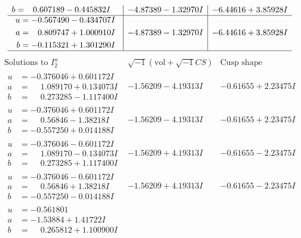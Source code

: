 \documentclass[1p]{elsarticle_modified}
\theoremstyle{definition}
\newcommand{\I}{\sqrt{-1}}
\begin{document}
$$\begin{array}{c|c|c}
\begin{aligned}
b &= \phantom{-}0.607189 - 0.445832 I\end{aligned}
 & -4.87389 - 1.32970 I & -6.44616 + 3.85928 I \\ \hline\begin{aligned}
u &= -0.567490 - 0.434707 I \\
a &= \phantom{-}0.809747 + 1.000910 I \\
b &= -0.115321 + 1.301290 I\end{aligned}
 & -4.87389 - 1.32970 I & -6.44616 + 3.85928 I\\
 \hline 
 \end{array}$$\newpage$$\begin{array}{c|c|c}  
\text{Solutions to }I^u_{2}& \I (\text{vol} + \sqrt{-1}CS) & \text{Cusp shape}\\
 \hline 
\begin{aligned}
u &= -0.376046 + 0.601172 I \\
a &= \phantom{-}1.089170 + 0.134073 I \\
b &= \phantom{-}0.273285 - 1.117400 I\end{aligned}
 & -1.56209 - 4.19313 I & -0.61655 + 2.23475 I \\ \hline\begin{aligned}
u &= -0.376046 + 0.601172 I \\
a &= \phantom{-}0.56846 - 1.38218 I \\
b &= -0.557250 + 0.014188 I\end{aligned}
 & -1.56209 - 4.19313 I & -0.61655 + 2.23475 I \\ \hline\begin{aligned}
u &= -0.376046 - 0.601172 I \\
a &= \phantom{-}1.089170 - 0.134073 I \\
b &= \phantom{-}0.273285 + 1.117400 I\end{aligned}
 & -1.56209 + 4.19313 I & -0.61655 - 2.23475 I \\ \hline\begin{aligned}
u &= -0.376046 - 0.601172 I \\
a &= \phantom{-}0.56846 + 1.38218 I \\
b &= -0.557250 - 0.014188 I\end{aligned}
 & -1.56209 + 4.19313 I & -0.61655 - 2.23475 I \\ \hline\begin{aligned}
u &= -0.561801\phantom{ +0.000000I} \\
a &= -1.53884 + 1.41722 I \\
b &= \phantom{-}0.265812 + 1.100900 I\end{aligned}

\end{array}$$
\end{document}
